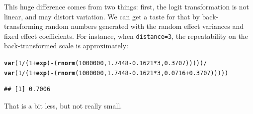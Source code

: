 \documentclass[12pt,a4paper]{scrartcl}\usepackage[]{graphicx}\usepackage[]{color}
\makeatletter
\newcommand{\hlnum}[1]{\textcolor[rgb]{0.686,0.059,0.569}{#1}}%
\newcommand{\hlopt}[1]{\textcolor[rgb]{0,0,0}{#1}}%
\newcommand{\hlstd}[1]{\textcolor[rgb]{0.345,0.345,0.345}{#1}}%
\newcommand{\hlkwd}[1]{\textcolor[rgb]{0.737,0.353,0.396}{\textbf{#1}}}%
\newenvironment{kframe}{%
 \def\at@end@of@kframe{}%
 \ifinner\ifhmode%
  \def\at@end@of@kframe{\end{minipage}}%
  \begin{minipage}{\columnwidth}%
 \fi\fi%
 \def\FrameCommand##1{\hskip\@totalleftmargin \hskip-\fboxsep
 \colorbox{shadecolor}{##1}\hskip-\fboxsep
     \hskip-\linewidth \hskip-\@totalleftmargin \hskip\columnwidth}%
 \MakeFramed {\advance\hsize-\width
   \@totalleftmargin\z@ \linewidth\hsize
   \@setminipage}}%
 {\par\unskip\endMakeFramed%
 \at@end@of@kframe}
\newenvironment{knitrout}{}{} %
\makeatother
\begin{document}
\begin{Answer}
This huge difference comes from two things: first, the logit transformation is not linear, and may distort variation. We can get a taste for that by back-transforming random numbers generated with the random effect variances and fixed effect coefficients. For instance, when \texttt{distance=3}, the repeatability on the back-transformed scale is approximately:

\begin{knitrout}
\color{fgcolor}\begin{kframe}
\begin{alltt}
\hlkwd{var}\hlstd{(}\hlnum{1}\hlopt{/}\hlstd{(}\hlnum{1}\hlopt{+}\hlkwd{exp}\hlstd{(}\hlopt{-}\hlstd{(}\hlkwd{rnorm}\hlstd{(}\hlnum{1000000}\hlstd{,} \hlnum{1.7448}\hlopt{-}\hlnum{0.1621}\hlopt{*}\hlnum{3}\hlstd{,} \hlnum{0.3707}\hlstd{)))))} \hlopt{/}
  \hlkwd{var}\hlstd{(}\hlnum{1}\hlopt{/}\hlstd{(}\hlnum{1}\hlopt{+}\hlkwd{exp}\hlstd{(}\hlopt{-}\hlstd{(}\hlkwd{rnorm}\hlstd{(}\hlnum{1000000}\hlstd{,} \hlnum{1.7448}\hlopt{-}\hlnum{0.1621}\hlopt{*}\hlnum{3}\hlstd{,} \hlnum{0.0716}\hlopt{+}\hlnum{0.3707}\hlstd{)))))}
\end{alltt}
\begin{verbatim}
## [1] 0.7006
\end{verbatim}
\end{kframe}
\end{knitrout}
That is a bit less, but not really small.


\end{Answer}
\end{document}
